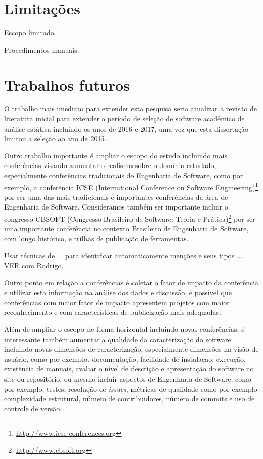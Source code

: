 
\section{Limitações}

Escopo limitado.

Procedimentos manuais.




\section{Trabalhos futuros}


O trabalho mais imediato para extender esta pesquisa seria atualizar a revisão
de literatura inicial para extender o período de seleção de software acadêmico
de análise estática incluindo os anos de 2016 e 2017, uma vez que esta
dissertação limitou a seleção ao ano de 2015.

Outro trabalho importante é ampliar o escopo do estudo incluindo mais
conferências visando aumentar o realismo sobre o domínio estudado,
especialmente conferências tradicionais de Engenharia de Software, como por
exemplo, a conferência ICSE (International Conference on Software
Engineering)\footnote{\url{http://www.icse-conferences.org}} por ser uma das
mais tradicionais e importantes conferências da área de Engenharia de Software.
Consideramos também ser importante incluir o congresso CBSOFT (Congresso
Brasileiro de Software: Teoria e Prática)\footnote{\url{http://www.cbsoft.org}}
por ser uma importante conferência no contexto Brasileiro de Engenharia de
Software, com longo histórico, e trilhas de publicação de ferramentas.

Usar técnicas de ... para identificar automaticamente menções e seus tipos ...
VER com Rodrigo.



Outro ponto em relação a conferências é coletar o fator de impacto da
conferência e utilizar esta informação na análise dos dados e discussão, é
possível que conferências com maior fator de impacto apresentem projetos com
maior reconhecimento e com características de publicização mais adequadas.

Além de ampliar o escopo de forma horizontal incluindo novas conferências, é
interessante também aumentar a qualidade da caracterização do software
incluindo novas dimensões de caracterização, especialmente dimensões na visão
de usuário, como por exemplo, documentação, facilidade de instalaçao, execução,
existência de manuais, avaliar o nível de descrição e apresentação do software
no site ou repositório, ou mesmo incluir aspectos de Engenharia de Software,
como por exemplo, testes, resolução de {\it issues}, métricas de qualidade como
por exemplo complexidade estrutural, número de contribuidores, número de
commits e uso de controle de versão.

